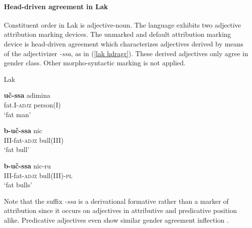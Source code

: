 \paragraph*{Head\hyp{}driven agreement in Lak}
Constituent order in Lak is adjective-noun. The language exhibits two adjective attribution marking devices. The unmarked and default attribution marking device is head\hyp{}driven agreement which characterizes adjectives derived by means of the adjectivizer \mbox{\textit{-ssa}}, as in (\ref{lak hdragr}). These derived adjectives only agree in gender class. Other morpho-syntactic marking is not applied.
\begin{exe}
\ex 
\label{lak hdragr}
\rm{Lak \citep[48]{zirkov1955}} 
\begin{xlist}
\ex 
\gll	\textbf{uč-ssa} adimina\\
	fat.\textsc{I}-\textsc{adjz} person(\textsc{I})\\
\glt	‘fat man’

\ex
\gll	\textbf{b-uč-ssa} nic\\
	\textsc{III}-fat-\textsc{adjz} bull\textsc{(III)}\\
\glt	‘fat bull’

\ex
\gll	\textbf{b-uč-ssa} nic-ru\\
	\textsc{III}-fat-\textsc{adjz} bull\textsc{(III)}-\textsc{pl}\\
\glt	‘fat bulls’
\end{xlist}
\end{exe}
Note that the suffix \textit{-ssa} is a derivational formative rather than a marker of attribution since it occurs on adjectives in attributive and predicative position alike. Predicative adjectives even show similar gender agreement inflection \citep[45–51]{zirkov1955}.

